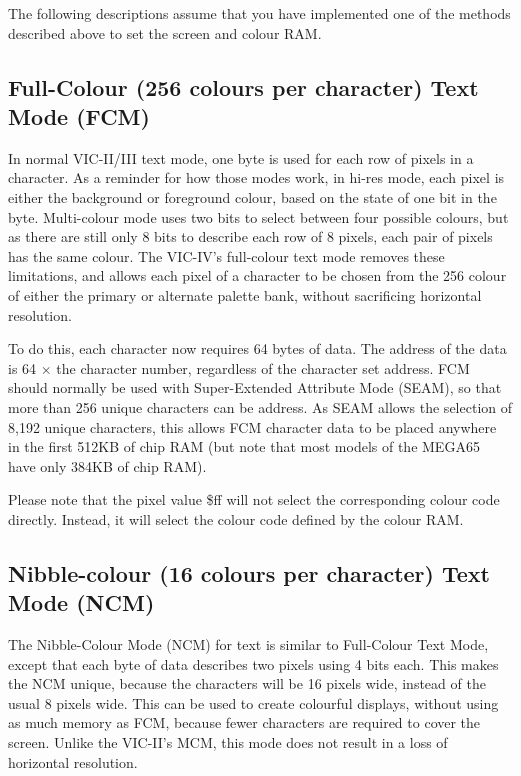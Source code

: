 The following descriptions assume that you have implemented one of the methods described above to set the screen and colour RAM.

\subsection{Full-Colour (256 colours per character) Text Mode (FCM)}

In normal VIC-II/III text mode, one byte is used for each row of pixels in a character.  As a reminder for how those modes work, in
hi-res mode, each pixel is either the background or foreground colour, based on the state of one bit in the byte.  Multi-colour mode
uses two bits to select between four possible colours, but as there are still only 8 bits to describe each row of 8 pixels, each pair
of pixels has the same colour. The VIC-IV's full-colour text mode removes these limitations, and allows each pixel of a character to
be chosen from the 256 colour of either the primary or alternate palette bank, without sacrificing horizontal resolution.

To do this, each character now requires 64 bytes of data. The address of the data is 64 $\times$ the character number, regardless
of the character set address.
FCM should
normally be used with Super-Extended Attribute Mode (SEAM), so that more than 256 unique characters can be address. As SEAM allows
the selection of 8,192 unique characters, this allows FCM character data to be placed anywhere in the first 512KB of chip RAM (but
note that most models of the MEGA65 have only 384KB of chip RAM).

Please note that the pixel value \$ff will not select the corresponding colour code directly. Instead, it will select the colour code defined by the colour RAM.

\subsection{Nibble-colour (16 colours per character) Text Mode (NCM)}

The Nibble-Colour Mode (NCM) for text is similar to Full-Colour Text Mode, except that each byte of data describes two
pixels using 4 bits each. This makes the NCM unique, because the characters will be 16 pixels wide, instead of the usual 8 pixels wide. This can be used to create colourful displays, without using as much memory as FCM, because fewer characters are required to cover the screen.  Unlike the VIC-II's MCM, this mode does not result in a loss of horizontal resolution.

